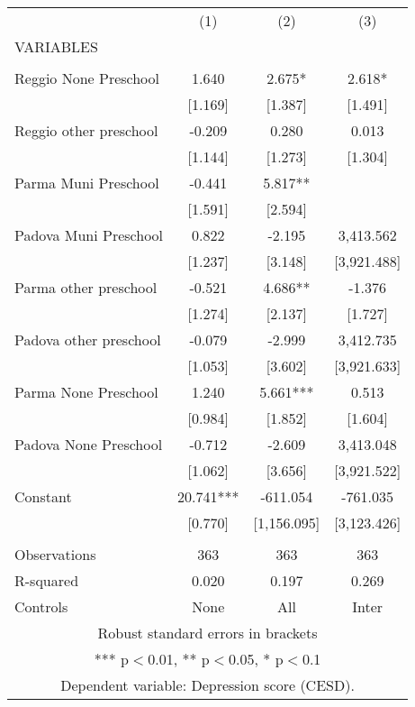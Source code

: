 \begin{tabular}{lccc} \hline
 & (1) & (2) & (3) \\
VARIABLES &  &  &  \\ \hline
 &  &  &  \\
Reggio None Preschool & 1.640 & 2.675* & 2.618* \\
 & [1.169] & [1.387] & [1.491] \\
Reggio other preschool & -0.209 & 0.280 & 0.013 \\
 & [1.144] & [1.273] & [1.304] \\
Parma Muni Preschool & -0.441 & 5.817** &  \\
 & [1.591] & [2.594] &  \\
Padova Muni Preschool & 0.822 & -2.195 & 3,413.562 \\
 & [1.237] & [3.148] & [3,921.488] \\
Parma other preschool & -0.521 & 4.686** & -1.376 \\
 & [1.274] & [2.137] & [1.727] \\
Padova other preschool & -0.079 & -2.999 & 3,412.735 \\
 & [1.053] & [3.602] & [3,921.633] \\
Parma None Preschool & 1.240 & 5.661*** & 0.513 \\
 & [0.984] & [1.852] & [1.604] \\
Padova None Preschool & -0.712 & -2.609 & 3,413.048 \\
 & [1.062] & [3.656] & [3,921.522] \\
Constant & 20.741*** & -611.054 & -761.035 \\
 & [0.770] & [1,156.095] & [3,123.426] \\
 &  &  &  \\
Observations & 363 & 363 & 363 \\
R-squared & 0.020 & 0.197 & 0.269 \\
 Controls & None & All & Inter \\ \hline
\multicolumn{4}{c}{ Robust standard errors in brackets} \\
\multicolumn{4}{c}{ *** p$<$0.01, ** p$<$0.05, * p$<$0.1} \\
\multicolumn{4}{c}{ Dependent variable: Depression score (CESD).} \\
\end{tabular}
